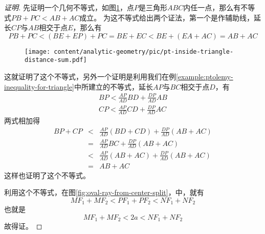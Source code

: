 \begin{proof}[证明]
  先证明一个几何不等式，如图\ref{fig:pt-inside-triangle-distance-sum}，点$P$是三角形$ABC$内任一点，那么有不等式$PB+PC<AB+AC$成立。
  为这不等式给出两个证法，第一个是作辅助线，延长$CP$与$AB$相交于点$E$，那么有
  \begin{equation*}
    PB+PC < (BE + EP) + PC = BE + EC < BE + (EA + AC) = AB + AC
  \end{equation*}

\begin{figure}[htbp]
  \centering
\texttt{[image: content/analytic-geometry/pic/pt-inside-triangle-distance-sum.pdf]}
\caption{}
\label{fig:pt-inside-triangle-distance-sum}
\end{figure}

这就证明了这个不等式，另外一个证明是利用我们在例\ref{example:ptolemy-inequality-for-triangle}中所建立的不等式，延长$AP$与$BC$相交于点$D$，有
\begin{eqnarray*}
  BP < \frac{AP}{AD} BD + \frac{DP}{AD} AB \\
  CP < \frac{AP}{AD} CD + \frac{DP}{AD} AC 
\end{eqnarray*}
两式相加得
\begin{eqnarray*}
  BP + CP & < & \frac{AP}{AD} (BD+CD) + \frac{DP}{AD} (AB+AC) \\
  & = & \frac{AP}{AD} BC + \frac{DP}{AD} (AB+AC) \\
  & < & \frac{AP}{AD} (AB+AC) + \frac{DP}{AD} (AB+AC) \\
  & = & AB+AC
\end{eqnarray*}
这样也证明了这个不等式。

利用这个不等式，在图\ref{fig:oval-ray-from-center-split}，中，就有
\begin{equation*}
  MF_1 + MF_2 < PF_1 + PF_2 < NF_1 + NF_2
\end{equation*}
  也就是
  \begin{equation*}
    MF_1 + MF_2 < 2a < NF_1 + NF_2
  \end{equation*}
  故得证。
\end{proof}



